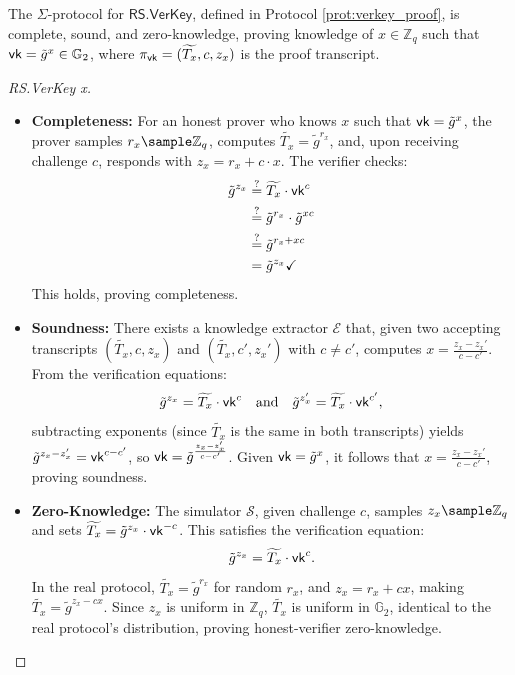 \begin{theorem}
    The $\Sigma$-protocol for $\mathsf{RS.VerKey}$, defined in Protocol \ref{prot:verkey_proof}, is complete, sound, and zero-knowledge, proving knowledge of $x \in \mathbb{Z}_q$ such that $\mathsf{vk} = \tilde{g}^x \in \mathbb{G}_2$, where $\pi_{\mathsf{vk}} = (\widetilde{T_{x}}, c, z_x)$ is the proof transcript.
\end{theorem}

\begin{proof}[RS.VerKey x]
    \begin{itemize}
        \item \textbf{Completeness:} For an honest prover who knows $x$ such that $\mathsf{vk} = \tilde{g}^x$, the prover samples $r_x \sample \mathbb{Z}_q$, computes $\widetilde{T_{x}} = \tilde{g}^{r_x}$, and, upon receiving challenge $c$, responds with $z_x = r_x + c \cdot x$. The verifier checks:
    \begin{align*}
        \tilde{g}^{z_x} &\stackrel{?}{=} \widetilde{T_{x}} \cdot \mathsf{vk}^c \\
        &\stackrel{?}{=} \tilde{g}^{r_x} \cdot \tilde{g}^{xc} \\
        &\stackrel{?}{=} \tilde{g}^{r_x + xc}\\
        &=\tilde{g}^{z_x} \checkmark
    \end{align*} 
    This holds, proving completeness.

        \item \textbf{Soundness:} There exists a knowledge extractor $\mathcal{E}$ that, given two accepting transcripts $(\widetilde{T_{x}}, c, z_x)$ and $(\widetilde{T_{x}}, c', z_x')$ with $c \neq c'$, computes $x = \frac{z_x - z_x'}{c - c'}$. From the verification equations:
        \[
        \tilde{g}^{z_x} = \widetilde{T_{x}} \cdot \mathsf{vk}^c \quad \text{and} \quad \tilde{g}^{z_x'} = \widetilde{T_{x}} \cdot \mathsf{vk}^{c'},
        \]
        subtracting exponents (since $\widetilde{T_{x}}$ is the same in both transcripts) yields $\tilde{g}^{z_x - z_x'} = \mathsf{vk}^{c - c'}$, so $\mathsf{vk} = \tilde{g}^{\frac{z_x - z_x'}{c - c'}}$. Given $\mathsf{vk} = \tilde{g}^x$, it follows that $x = \frac{z_x - z_x'}{c - c'}$, proving soundness.

        \item \textbf{Zero-Knowledge:} The simulator $\mathcal{S}$, given challenge $c$, samples $z_x \sample \mathbb{Z}_q$ and sets $\widetilde{T_{x}} = \tilde{g}^{z_x} \cdot \mathsf{vk}^{-c}$. This satisfies the verification equation:
        \[
        \tilde{g}^{z_x} = \widetilde{T_{x}} \cdot \mathsf{vk}^c.
        \]
        In the real protocol, $\widetilde{T_{x}} = \tilde{g}^{r_x}$ for random $r_x$, and $z_x = r_x + c x$, making $\widetilde{T_{x}} = \tilde{g}^{z_x - c x}$. Since $z_x$ is uniform in $\mathbb{Z}_q$, $\widetilde{T_{x}}$ is uniform in $\mathbb{G}_2$, identical to the real protocol’s distribution, proving honest-verifier zero-knowledge.
    \end{itemize}
\end{proof}


